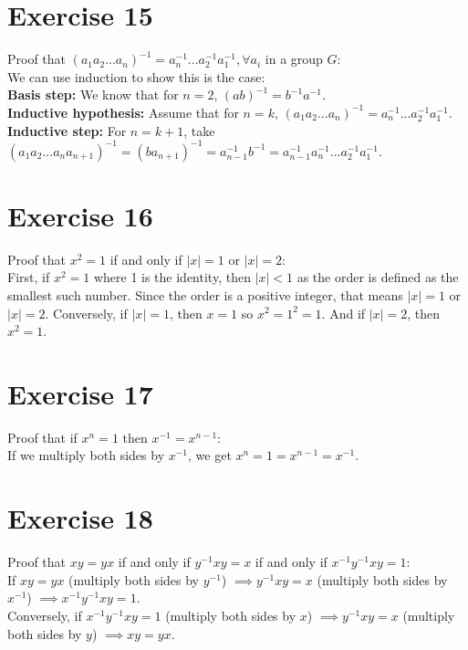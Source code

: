 \documentclass[12pt]{article}
\begin{document}
    \section*{Exercise 15}
    Proof that $(a_1a_2...a_n)^{-1} = a_n^{-1}...a_2^{-1}a_1^{-1},
    \forall a_i$ in a group $G$: \\
    We can use induction to show this is the case:\\
    \textbf{Basis step:}
    We know that for $n = 2$, $(ab)^{-1}
    = b^{-1}a^{-1}$.\\
    \textbf{Inductive hypothesis:}
    Assume that for $n = k$, $(a_1a_2...a_n)^{-1}
    = a_n^{-1}...a_2^{-1}a_1^{-1}$. \\ 
    \textbf{Inductive step:}
    For $n = k + 1$,
    take $(a_1a_2...a_na_{n+1})^{-1}
    = (ba_{n+1})^{-1} = a_{n-1}^{-1}b^{-1}
    = a_{n-1}^{-1}a_n^{-1}...a_2^{-1}a_1^{-1}$.

    \section*{Exercise 16}
    Proof that $x^2 = 1$ if and only if $|x| = 1$ or $|x| = 2$: \\
    First, if $x^2 = 1$
    where 1 is the identity,
    then $|x| < 1$ as the order is defined as the smallest such number.
    Since the order is a positive integer,
    that means $|x| = 1$ or $|x| = 2$.
    Conversely, if $|x| = 1$,
    then $x = 1$ so $x^2 = 1^2 = 1$.
    And if $|x| = 2$,
    then $x^2 = 1$.


    \section*{Exercise 17}
    Proof that if $x^n = 1$ then $x^{-1} = x^{n-1}$: \\
    If we multiply both sides by $x^{-1}$,
    we get  $x^n = 1 = x^{n-1} = x^{-1}$.


    \section*{Exercise 18}
    Proof that $xy = yx$ if and only if $y^{-1}xy = x$
    if and only if $x^{-1}y^{-1}xy = 1$: \\
    If $xy = yx$
    (multiply both sides by $y^{-1}$)
    $\implies y^{-1}xy = x$
    (multiply both sides by $x^{-1}$)
    $\implies x^{-1}y^{-1}xy = 1$. \\
    Conversely, if $x^{-1}y^{-1}xy = 1$
    (multiply both sides by $x$)
    $\implies y^{-1}xy = x$
    (multiply both sides by $y$)
    $\implies xy = yx$.
\end{document}
